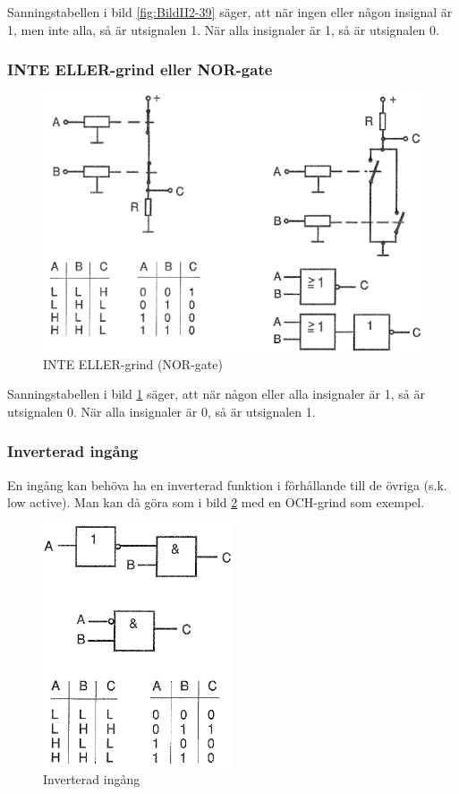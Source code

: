 Sanningstabellen i bild \ref{fig:BildII2-39} säger, att när ingen eller någon
insignal är 1, men inte alla, så är utsignalen 1.
När alla insignaler är 1, så är utsignalen 0.

\subsubsection{INTE ELLER-grind eller NOR-gate}

\begin{figure}
\includegraphics[width=\textwidth]{images/cropped_pdfs/bild_2_2-40.pdf}
\caption{INTE ELLER-grind (NOR-gate)}
\label{fig:BildII2-40}
\end{figure}

Sanningstabellen i bild \ref{fig:BildII2-40} säger, att när någon eller alla
insignaler är 1, så är utsignalen 0.
När alla insignaler är 0, så är utsignalen 1.

\subsubsection{Inverterad ingång}

En ingång kan behöva ha en inverterad funktion i förhållande till de övriga
(s.k. low active).
Man kan då göra som i bild \ref{fig:BildII2-41} med en OCH-grind som exempel.

\begin{figure}
\includegraphics[width=0.5\textwidth]{images/cropped_pdfs/bild_2_2-41.pdf}
\caption{Inverterad ingång}
\label{fig:BildII2-41}
\end{figure}

